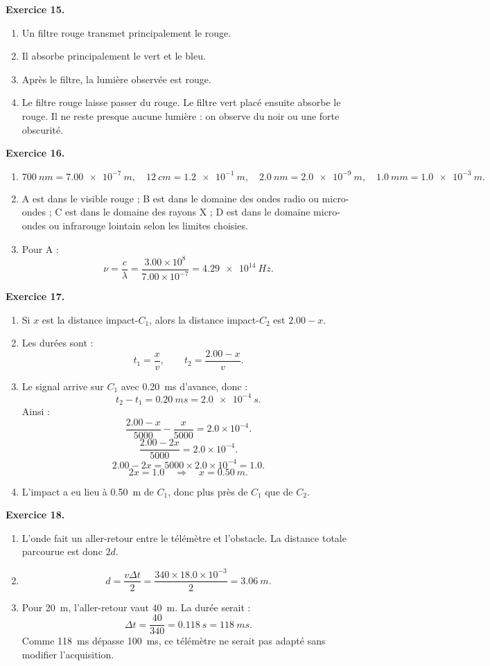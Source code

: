 \documentclass[11pt,a4paper]{article}
\newcommand{\corr}[2]{
  \begin{correctionbox}
  \textbf{Exercice #1.} #2
  \end{correctionbox}
}
\begin{document}
\corr{15}{
\begin{enumerate}
  \item Un filtre rouge transmet principalement le rouge.
  \item Il absorbe principalement le vert et le bleu.
  \item Après le filtre, la lumière observée est rouge.
  \item Le filtre rouge laisse passer du rouge. Le filtre vert placé ensuite absorbe le rouge. Il ne reste presque aucune lumière : on observe du noir ou une forte obscurité.
\end{enumerate}
}

\corr{16}{
\begin{enumerate}
  \item
  \[
  \SI{700}{nm}=\SI{7.00e-7}{m},\quad
  \SI{12}{cm}=\SI{1.2e-1}{m},\quad
  \SI{2.0}{nm}=\SI{2.0e-9}{m},\quad
  \SI{1.0}{mm}=\SI{1.0e-3}{m}.
  \]
  \item A est dans le visible rouge ; B est dans le domaine des ondes radio ou micro-ondes ; C est dans le domaine des rayons X ; D est dans le domaine micro-ondes ou infrarouge lointain selon les limites choisies.
  \item Pour A :
  \[
  \nu=\frac{c}{\lambda}=\frac{3.00\times 10^8}{7.00\times 10^{-7}}
  =\SI{4.29e14}{Hz}.
  \]
\end{enumerate}
}

\corr{17}{
\begin{enumerate}
  \item Si $x$ est la distance impact-$C_1$, alors la distance impact-$C_2$ est $2.00-x$.
  \item Les durées sont :
  \[
  t_1=\frac{x}{v},\qquad t_2=\frac{2.00-x}{v}.
  \]
  \item Le signal arrive sur $C_1$ avec \SI{0.20}{ms} d'avance, donc :
  \[
  t_2-t_1=\SI{0.20}{ms}=\SI{2.0e-4}{s}.
  \]
  Ainsi :
  \[
  \frac{2.00-x}{5000}-\frac{x}{5000}=2.0\times 10^{-4}.
  \]
  \[
  \frac{2.00-2x}{5000}=2.0\times 10^{-4}.
  \]
  \[
  2.00-2x=5000\times 2.0\times 10^{-4}=1.0.
  \]
  \[
  2x=1.0 \quad \Rightarrow \quad x=\SI{0.50}{m}.
  \]
  \item L'impact a eu lieu à \SI{0.50}{m} de $C_1$, donc plus près de $C_1$ que de $C_2$.
\end{enumerate}
}

\corr{18}{
\begin{enumerate}
  \item L'onde fait un aller-retour entre le télémètre et l'obstacle. La distance totale parcourue est donc $2d$.
  \item
  \[
  d=\frac{v\Delta t}{2}
  =\frac{340\times 18.0\times 10^{-3}}{2}
  =\SI{3.06}{m}.
  \]
  \item Pour \SI{20}{m}, l'aller-retour vaut \SI{40}{m}. La durée serait :
  \[
  \Delta t=\frac{40}{340}=\SI{0.118}{s}=\SI{118}{ms}.
  \]
  Comme \SI{118}{ms} dépasse \SI{100}{ms}, ce télémètre ne serait pas adapté sans modifier l'acquisition.
\end{enumerate}
}
\end{document}
